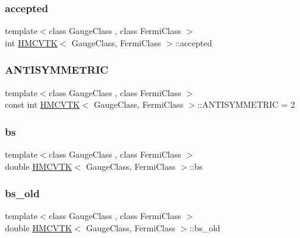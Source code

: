 \subsubsection{\texorpdfstring{accepted}{accepted}}
{\footnotesize\ttfamily template$<$class Gauge\+Class , class Fermi\+Class $>$ \\
int \hyperlink{class_h_m_c_v_t_k}{H\+M\+C\+V\+TK}$<$ Gauge\+Class, Fermi\+Class $>$\+::accepted}

\mbox{\label{class_h_m_c_v_t_k_affb37f648aabe12dc443875541d592a2}} 
\subsubsection{\texorpdfstring{A\+N\+T\+I\+S\+Y\+M\+M\+E\+T\+R\+IC}{ANTISYMMETRIC}}
{\footnotesize\ttfamily template$<$class Gauge\+Class , class Fermi\+Class $>$ \\
const int \hyperlink{class_h_m_c_v_t_k}{H\+M\+C\+V\+TK}$<$ Gauge\+Class, Fermi\+Class $>$\+::A\+N\+T\+I\+S\+Y\+M\+M\+E\+T\+R\+IC = 2\hspace{0.3cm}{\ttfamily [static]}}

\mbox{\label{class_h_m_c_v_t_k_a6aa71649ab9cc4d95094b7ff552ae0f0}} 
\subsubsection{\texorpdfstring{bs}{bs}}
{\footnotesize\ttfamily template$<$class Gauge\+Class , class Fermi\+Class $>$ \\
double \hyperlink{class_h_m_c_v_t_k}{H\+M\+C\+V\+TK}$<$ Gauge\+Class, Fermi\+Class $>$\+::bs}

\mbox{\label{class_h_m_c_v_t_k_a8be797b779ed5996e1a2f1b357ac06d0}} 
\subsubsection{\texorpdfstring{bs\+\_\+old}{bs\_old}}
{\footnotesize\ttfamily template$<$class Gauge\+Class , class Fermi\+Class $>$ \\
double \hyperlink{class_h_m_c_v_t_k}{H\+M\+C\+V\+TK}$<$ Gauge\+Class, Fermi\+Class $>$\+::bs\+\_\+old}

